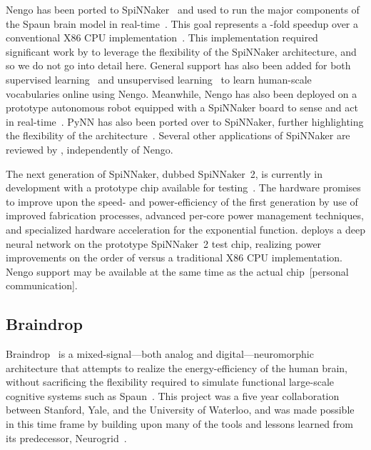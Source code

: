 Nengo has been ported to SpiNNaker~\citep{galluppi2012real, mundy2015} and used to run the major components of the Spaun brain model in real-time~\citep{mundy2016real}.
This goal represents a -fold speedup over a conventional X86 CPU implementation~\citep{stewart2014large}.
This implementation required significant work by \citet{mundy2016real} to leverage the flexibility of the SpiNNaker architecture, and so we do not go into detail here.
General support has also been added for both supervised learning~\citep{davies2013} and unsupervised learning~\citep{knight2016} to learn human-scale vocabularies online using Nengo.
Meanwhile, Nengo has also been deployed on a prototype autonomous robot equipped with a SpiNNaker board to sense and act in real-time~\citep{galluppi2014}.
PyNN has also been ported over to SpiNNaker, further highlighting the flexibility of the architecture~\citep{rhodes2018spynnaker}.
Several other applications of SpiNNaker are reviewed by \citet{rhodes2018spynnaker}, independently of Nengo.

The next generation of SpiNNaker, dubbed SpiNNaker~2, is currently in development with a prototype chip available for testing~\citep{liu2018memory}.
The hardware promises to improve upon the speed- and power-efficiency of the first generation by use of improved fabrication processes, advanced per-core power management techniques, and specialized hardware acceleration for the exponential function.
\citet{liu2018memory} deploys a deep neural network on the prototype SpiNNaker~2 test chip, realizing power improvements on the order of  versus a traditional X86 CPU implementation.
Nengo support may be available at the same time as the actual chip~[personal communication].

\subsection{Braindrop}

Braindrop~\citep{braindrop2019} is a mixed-signal---both analog and digital---neuromorphic architecture that attempts to realize the energy-efficiency of the human brain, without sacrificing the flexibility required to simulate functional large-scale cognitive systems such as Spaun~\citep{eliasmith2012}.
This project was a five year collaboration between Stanford, Yale, and the University of Waterloo, and was made possible in this time frame 
by building upon many of the tools and lessons learned from its predecessor, Neurogrid~\citep{neurogrid2014}. 

